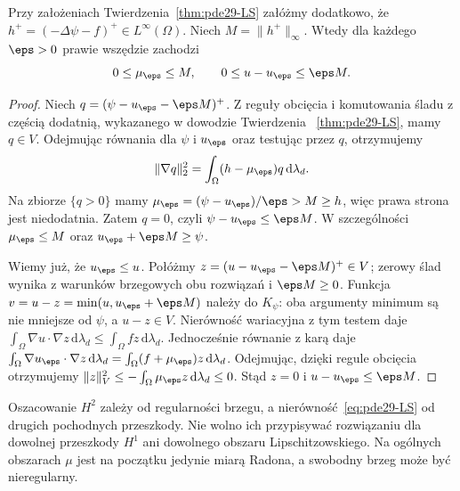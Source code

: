 \begin{wniosek}
\label{cor:pde29-penalty-linfty}
Przy założeniach Twierdzenia~\ref{thm:pde29-LS}
załóżmy dodatkowo, że $h^+=(-\Delta\psi-f)^+
\in L^\infty(\Omega)$. Niech $M=\|h^+\|_\infty$.
Wtedy dla każdego $\eps>0$ prawie wszędzie zachodzi
\[
 0\le\mu_\eps\le M,\qquad
 0\le u-u_\eps\le\eps M.
\]
\end{wniosek}
\begin{proof}
Niech $q=(\psi-u_\eps-\eps M)^+$.
Z reguły obcięcia i komutowania śladu z częścią
dodatnią, wykazanego w dowodzie Twierdzenia
~\ref{thm:pde29-LS}, mamy $q\in V$.
Odejmując równania dla $\psi$ i $u_\eps$
oraz testując przez $q$, otrzymujemy
\[
 \|\nabla q\|_2^2
 =\int_\Omega(h-\mu_\eps)q\,\mathrm d\lambda_d.
\]
Na zbiorze $\{q>0\}$ mamy
$\mu_\eps=(\psi-u_\eps)/\eps>M\ge h$,
więc prawa strona jest niedodatnia.
Zatem $q=0$, czyli $\psi-u_\eps\le\eps M$.
W szczególności $\mu_\eps\le M$ oraz
$u_\eps+\eps M\ge\psi$.

Wiemy już, że $u_\eps\le u$.
Połóżmy $z=(u-u_\eps-\eps M)^+\in V$;
zerowy ślad wynika z warunków brzegowych
obu rozwiązań i $\eps M\ge0$.
Funkcja $v=u-z=\min(u,u_\eps+\eps M)$
należy do $K_\psi$: oba argumenty minimum
są nie mniejsze od $\psi$, a $u-z\in V$.
Nierówność wariacyjna z tym testem daje
$\int_\Omega\nabla u\cdot\nabla z\,\mathrm d\lambda_d
\le\int_\Omega fz\,\mathrm d\lambda_d$.
Jednocześnie równanie z karą daje
$\int_\Omega\nabla u_\eps\cdot\nabla z\,
\mathrm d\lambda_d=\int_\Omega(f+\mu_\eps)z\,
\mathrm d\lambda_d$.
Odejmując, dzięki regule obcięcia otrzymujemy
$\|z\|_V^2\le-\int_\Omega\mu_\eps z\,
\mathrm d\lambda_d\le0$. Stąd $z=0$ i
$u-u_\eps\le\eps M$.
\end{proof}

\begin{uwaga}
Oszacowanie $H^2$ zależy od regularności brzegu, a
nierówność~\eqref{eq:pde29-LS} od drugich pochodnych przeszkody.
Nie wolno ich przypisywać rozwiązaniu dla dowolnej
przeszkody $H^1$ ani dowolnego obszaru Lipschitzowskiego.
Na ogólnych obszarach $\mu$ jest na początku jedynie miarą
Radona, a swobodny brzeg może być nieregularny.
\end{uwaga}

